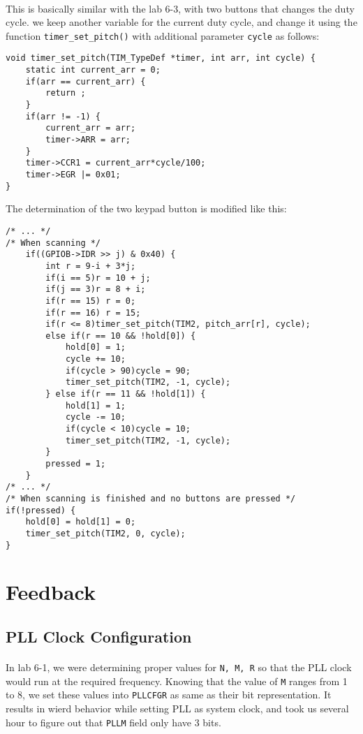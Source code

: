 \paragraph{}
This is basically similar with the lab 6-3, with two buttons that changes the duty cycle.
we keep another variable for the current duty cycle,
and change it using the function \texttt{timer\_set\_pitch()} with additional parameter \texttt{cycle} as follows:
\begin{lstlisting}
void timer_set_pitch(TIM_TypeDef *timer, int arr, int cycle) {
	static int current_arr = 0;
	if(arr == current_arr) {
		return ;
	}
	if(arr != -1) {
		current_arr = arr;
		timer->ARR = arr;
	}
	timer->CCR1 = current_arr*cycle/100;
	timer->EGR |= 0x01;
}
\end{lstlisting}
The determination of the two keypad button is modified like this:
\begin{lstlisting}
/* ... */
/* When scanning */
    if((GPIOB->IDR >> j) & 0x40) {
        int r = 9-i + 3*j;
        if(i == 5)r = 10 + j;
        if(j == 3)r = 8 + i;
        if(r == 15) r = 0;
        if(r == 16) r = 15;
        if(r <= 8)timer_set_pitch(TIM2, pitch_arr[r], cycle);
        else if(r == 10 && !hold[0]) {
            hold[0] = 1;
            cycle += 10;
            if(cycle > 90)cycle = 90;
            timer_set_pitch(TIM2, -1, cycle);
        } else if(r == 11 && !hold[1]) {
            hold[1] = 1;
            cycle -= 10;
            if(cycle < 10)cycle = 10;
            timer_set_pitch(TIM2, -1, cycle);
        }
        pressed = 1;
    }
/* ... */
/* When scanning is finished and no buttons are pressed */
if(!pressed) {
    hold[0] = hold[1] = 0;
    timer_set_pitch(TIM2, 0, cycle);
}
\end{lstlisting}
\section{Feedback}
\subsection{PLL Clock Configuration}
\paragraph{}
In lab 6-1, we were determining proper values for \texttt{N, M, R} so that the PLL clock would run at the required frequency.
Knowing that the value of \texttt{M} ranges from 1 to 8, we set these values into \texttt{PLLCFGR} as same as their bit representation.
It results in wierd behavior while setting PLL as system clock, 
and took us several hour to figure out that \texttt{PLLM} field only have 3 bits.
